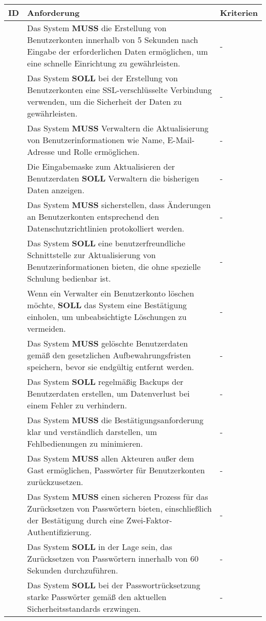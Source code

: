 \begin{tabular} {|p{}|p{}|p{}|}
	\hline
	ID & Anforderung & Kriterien \\
	\hline
	\printfreqnr
	& Das System \textbf{MUSS} die Erstellung von Benutzerkonten innerhalb von 5 Sekunden nach Eingabe der erforderlichen Daten ermöglichen, um eine schnelle Einrichtung zu gewährleisten. 
	& - \\ 
	\hline
	\printfreqnr
	& Das System \textbf{SOLL} bei der Erstellung von Benutzerkonten eine SSL-verschlüsselte Verbindung verwenden, um die Sicherheit der Daten zu gewährleisten.
	& - \\ 
	\hline
	\printfreqnr
	& Das System \textbf{MUSS} Verwaltern die Aktualisierung von Benutzerinformationen wie Name, E-Mail-Adresse und Rolle ermöglichen.
	& - \\ 
	\hline
	\printfreqnr
	& Die Eingabemaske zum Aktualisieren der Benutzerdaten \textbf{SOLL} Verwaltern die bisherigen Daten anzeigen.
	& - \\ 
	\hline
	\printfreqnr
	& Das System \textbf{MUSS} sicherstellen, dass Änderungen an Benutzerkonten entsprechend den Datenschutzrichtlinien protokolliert werden.
	& - \\ 
	\hline
	\printfreqnr
	& Das System \textbf{SOLL} eine benutzerfreundliche Schnittstelle zur Aktualisierung von Benutzerinformationen bieten, die ohne spezielle Schulung bedienbar ist.
	& - \\ 
	\hline
	\printfreqnr
	& Wenn ein Verwalter ein Benutzerkonto löschen möchte, \textbf{SOLL} das System eine Bestätigung einholen, um unbeabsichtigte Löschungen zu vermeiden.
	& - \\ 
	\hline
	\printfreqnr
	& Das System \textbf{MUSS} gelöschte Benutzerdaten gemäß den gesetzlichen Aufbewahrungsfristen speichern, bevor sie endgültig entfernt werden.
	& - \\ 
	\hline
	\printfreqnr
	& Das System \textbf{SOLL} regelmäßig Backups der Benutzerdaten erstellen, um Datenverlust bei einem Fehler zu verhindern.
	& - \\ 
	\hline
	\printfreqnr
	& Das System \textbf{MUSS} die Bestätigungsanforderung klar und verständlich darstellen, um Fehlbedienungen zu minimieren.
	& - \\ 
	\hline
	\printfreqnr
	& Das System \textbf{MUSS} allen Akteuren außer dem Gast  ermöglichen, Passwörter für Benutzerkonten zurückzusetzen. 
	& - \\
	\hline
	\printfreqnr
	& Das System \textbf{MUSS} einen sicheren Prozess für das Zurücksetzen von Passwörtern bieten, einschließlich der Bestätigung durch eine Zwei-Faktor-Authentifizierung. 
	& - \\
	\hline
	\printfreqnr
	& Das System \textbf{SOLL} in der Lage sein, das Zurücksetzen von Passwörtern innerhalb von 60 Sekunden durchzuführen. 
	& - \\
	\hline
	\printfreqnr
	& Das System \textbf{SOLL} bei der Passwortrücksetzung starke Passwörter gemäß den aktuellen Sicherheitsstandards erzwingen. 
	& - \\
	\hline
\end{tabular}

